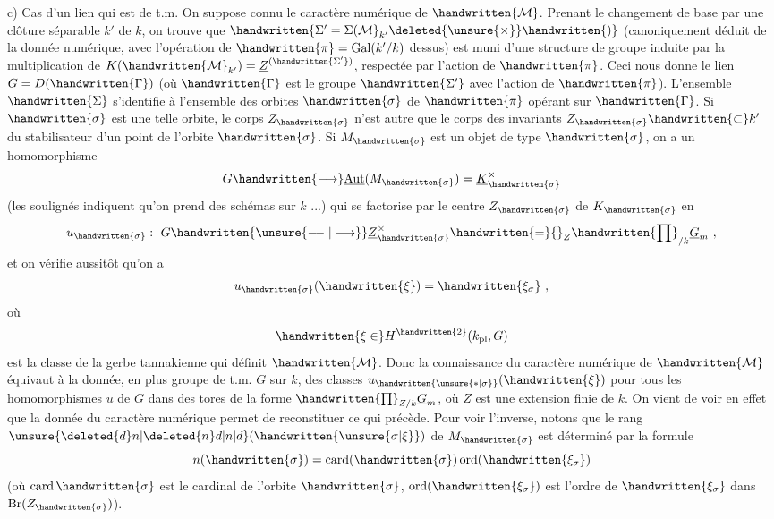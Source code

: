 c) Cas d'un lien qui est de t.m. On suppose connu le caractère numérique  de $\handwritten{\mathcal{M}}$. Prenant le changement de base par une clôture séparable $k'$ de $k$, on trouve que $\handwritten{\Sigma'=\Sigma(\mathcal{M}}_{k'}\deleted{\unsure{\times}}\handwritten{)}$ (canoniquement déduit de la donnée numérique, avec l'opération de $\handwritten{\pi}=\operatorname{Gal}(k'/k)$ dessus) est muni d'une structure de groupe induite par la multiplication de $K(\handwritten{\mathcal{M}}_{k'})=\underline{Z}^{(\handwritten{\Sigma'})}$,  respectée par l'action de $\handwritten{\pi}$. Ceci nous donne le lien $G=D(\handwritten{\Gamma})$ (où $\handwritten{\Gamma}$ est le groupe $\handwritten{\Sigma'}$ avec l'action de $\handwritten{\pi}$). L'ensemble $\handwritten{\Sigma}$ s'identifie à l'ensemble des orbites $\handwritten{\sigma}$ de $\handwritten{\pi}$ opérant sur $\handwritten{\Gamma}$. Si $\handwritten{\sigma}$ est une telle orbite, le corps $Z_{\handwritten{\sigma}}$ n'est autre que le corps des invariants $Z_{\handwritten{\sigma}}\handwritten{\subset}k'$ du stabilisateur d'un point de l'orbite $\handwritten{\sigma}$. Si $M_{\handwritten{\sigma}}$ est un objet de type $\handwritten{\sigma}$, on a un homomorphisme
\[
G\handwritten{\longrightarrow}\underline{\operatorname{Aut}}(M_{\handwritten{\sigma}})=\underline{K}_{\handwritten{\sigma}}^\times
\]
(les soulignés indiquent qu'on prend des schémas sur $k$ ...) qui se factorise par le centre $Z_{\handwritten{\sigma}}$ de $K_{\handwritten{\sigma}}$ en
\[
u_{\handwritten{\sigma}}:\ G\handwritten{\unsure{\mathrel{-\! -}|\longrightarrow}}\underline{Z}_{\handwritten{\sigma}}^\times\handwritten{=}{}_{Z}\handwritten{\prod}_{/k}\underline{G}_m\ ,
\]
et on vérifie aussitôt qu'on a
\[
u_{\handwritten{\sigma}}(\handwritten{\xi})=\handwritten{\xi_\sigma}\ ,
\]
où
\[
\handwritten{\xi\in}H^{\handwritten{2}}(k_{\mathrm{pl}},G)
\]
est la classe de la gerbe tannakienne qui définit $\handwritten{\mathcal{M}}$. Donc la connaissance du caractère numérique de $\handwritten{\mathcal{M}}$ équivaut à la donnée, en plus  groupe de t.m. $G$ sur $k$, des classes $u_{\handwritten{\unsure{*|\sigma}}}(\handwritten{\xi})$ pour tous les homomorphismes $u$ de $G$ dans des tores de la forme $\handwritten{\prod}_{Z/k}\underline{G}_m$, où $Z$ est une extension finie de $k$. \deleted{(}On vient de voir en effet que la donnée du caractère numérique permet de reconstituer ce qui précède. Pour voir l'inverse, notons que  le rang $\unsure{\deleted{d}n|\deleted{n}d|n|d}(\handwritten{\unsure{\sigma|\xi}})$ de $M_{\handwritten{\sigma}}$ est déterminé par la formule
\[
n(\handwritten{\sigma})=\operatorname{card}(\handwritten{\sigma})\operatorname{ord}(\handwritten{\xi_\sigma})
\]
(où $\operatorname{card}\handwritten{\sigma}$ est le cardinal de l'orbite $\handwritten{\sigma}$, $\operatorname{ord}(\handwritten{\xi_\sigma})$ est l'ordre de $\handwritten{\xi_\sigma}$ dans $\operatorname{Br}(Z_{\handwritten{\sigma}})$).

